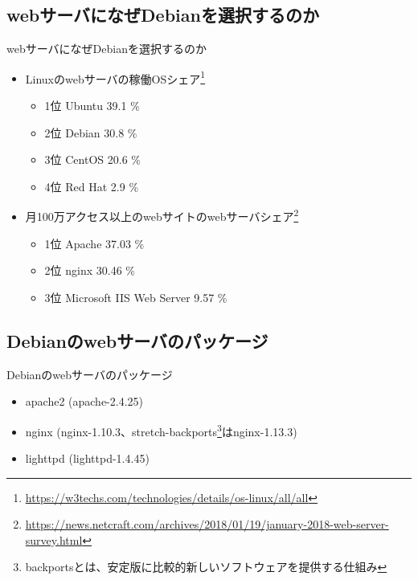 \subsection{webサーバになぜDebianを選択するのか}

\begin{frame}{webサーバになぜDebianを選択するのか}%
\begin{itemize}
  \item Linuxのwebサーバの稼働OSシェア\footnote{\url{https://w3techs.com/technologies/details/os-linux/all/all}}
  \begin{itemize}
    \item 1位 Ubuntu 39.1 \%
    \item 2位 Debian 30.8 \%
    \item 3位 CentOS 20.6 \%
    \item 4位 Red Hat 2.9 \%
  \end{itemize}

  \item 月100万アクセス以上のwebサイトのwebサーバシェア\footnote{\url{https://news.netcraft.com/archives/2018/01/19/january-2018-web-server-survey.html}}
  \begin{itemize}
    \item 1位 Apache 37.03 \% %
    \item 2位 nginx 30.46 \% %
    \item 3位 Microsoft IIS Web Server 9.57 \%      
  \end{itemize}
\end{itemize}

\end{frame}


\subsection{Debianのwebサーバのパッケージ}

\begin{frame}{Debianのwebサーバのパッケージ}%

\begin{itemize}
  \item apache2 (apache-2.4.25)
  \item nginx (nginx-1.10.3、stretch-backports\footnote{backportsとは、安定版に比較的新しいソフトウェアを提供する仕組み}はnginx-1.13.3)
  \item lighttpd (lighttpd-1.4.45)
\end{itemize}

\end{frame}


